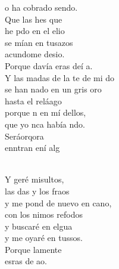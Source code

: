 \begin{cancion}
	o ha cobrado sendo.\\
	Que las hes que \\
	he pdo en el elio\\
	se mían en tusazos\\
	acundome desio. \\
	Porque davía eras deí a.\\
	Y las madas de la te de mi do\\
	se han nado en un gris oro\\
	hasta el reláago\\
	porque n en mí dellos,\\
	que yo nca había ndo.\\
	Seráorqora \\
	enntran ení alg\\\jump\\
	\begin{chorus}%
	Y geré misultos,\\
	las das y los fraos\\
	y me pond de nuevo en cano, \\
	con los nimos refodos\\
	y  buscaré en elgua\\
	y me oyaré en tussos.\\
	Porque lamente   \\
	esras de  ao.\\
	\end{chorus}%
	\jump\\
\end{cancion}%
